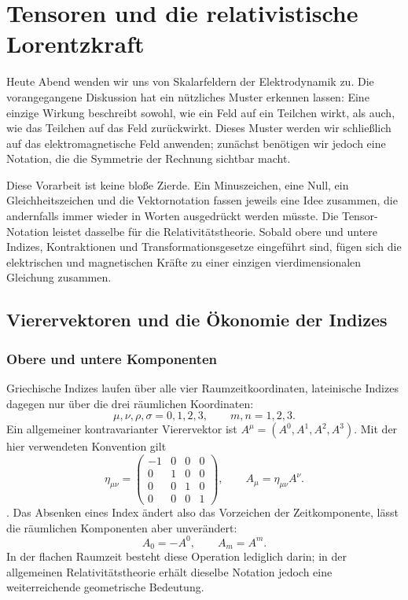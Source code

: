 \chapter{Tensoren und die relativistische Lorentzkraft}

Heute Abend wenden wir uns von Skalarfeldern der Elektrodynamik zu. Die vorangegangene Diskussion hat ein nützliches Muster erkennen lassen: Eine einzige Wirkung beschreibt sowohl, wie ein Feld auf ein Teilchen wirkt, als auch, wie das Teilchen auf das Feld zurückwirkt. Dieses Muster werden wir schließlich auf das elektromagnetische Feld anwenden; zunächst benötigen wir jedoch eine Notation, die die Symmetrie der Rechnung sichtbar macht.

Diese Vorarbeit ist keine bloße Zierde. Ein Minuszeichen, eine Null, ein Gleichheitszeichen und die Vektornotation fassen jeweils eine Idee zusammen, die andernfalls immer wieder in Worten ausgedrückt werden müsste. Die Tensor-Notation leistet dasselbe für die Relativitätstheorie. Sobald obere und untere Indizes, Kontraktionen und Transformationsgesetze eingeführt sind, fügen sich die elektrischen und magnetischen Kräfte zu einer einzigen vierdimensionalen Gleichung zusammen.

\section{Vierervektoren und die Ökonomie der Indizes}

\subsection{Obere und untere Komponenten}

Griechische Indizes laufen über alle vier Raumzeitkoordinaten, lateinische Indizes dagegen nur über die drei räumlichen Koordinaten: \begin{equation}
\mu,\nu,\rho,\sigma=0,1,2,3,
\qquad
m,n=1,2,3.
\end{equation}Ein allgemeiner kontravarianter Vierervektor ist \(A^\mu=(A^0,A^1,A^2,A^3)\). Mit der hier verwendeten Konvention gilt \begin{equation}
\eta_{\mu\nu}
=
\begin{pmatrix}
-1&0&0&0\\
0&1&0&0\\
0&0&1&0\\
0&0&0&1
\end{pmatrix},
\qquad
A_\mu=\eta_{\mu\nu}A^\nu .
\label{eq:sr6-metric-lowering}
\end{equation}. Das Absenken eines Index ändert also das Vorzeichen der Zeitkomponente, lässt die räumlichen Komponenten aber unverändert: \begin{equation}
A_0=-A^0,
\qquad
A_m=A^m.
\label{eq:sr6-component-lowering}
\end{equation}In der flachen Raumzeit besteht diese Operation lediglich darin; in der allgemeinen Relativitätstheorie erhält dieselbe Notation jedoch eine weiterreichende geometrische Bedeutung.

